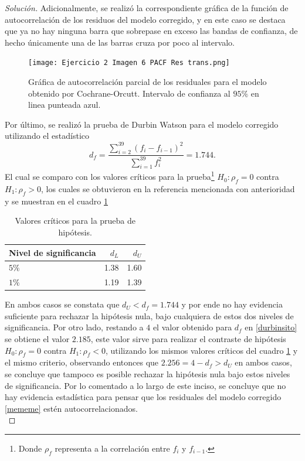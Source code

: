 \documentclass[10.5pt,notitlepage]{article}
\newenvironment{solucion}
  {\begin{proof}[Solución]}
  {\end{proof}}
\theoremstyle{plain}
\begin{document}
\begin{solucion}
Adicionalmente, se realizó la correspondiente gráfica de la función de autocorrelación de los residuos del modelo corregido, y en este caso se destaca que ya no hay ninguna barra que sobrepase en exceso las bandas de confianza, de hecho únicamente una de las barras cruza por poco al intervalo. 
\begin{figure}[htb]
 \centering
 \texttt{[image: Ejercicio 2 Imagen 6 PACF Res trans.png]}
 \caption{Gráfica de autocorrelación parcial de los residuales para el modelo obtenido por Cochrane-Orcutt. Intervalo de confianza al \(95\%\) en linea punteada azul.}
\label{fig:8}
\end{figure}
Por último, se realizó la prueba de Durbin Watson para el modelo corregido utilizando el estadístico 
\begin{equation}\label{durbinsito}
    d_f = \frac{\sum_{i = 2}^{39}(f_{i} - f_{i-1})^2}{\sum_{i = 1}^{39} f_{i}^2} =  1.744. 
\end{equation}
El cual se comparo con los valores críticos para la prueba\footnote{Donde \(\rho_f\) representa a la correlación entre \(f_i\) y \(f_{i-1}\).} \(H_0: \rho_f = 0\) contra \(H_1: \rho_f > 0\), los cuales se obtuvieron en la referencia mencionada con anterioridad y se muestran en el cuadro \ref{tab:Durbin2}
\begin{table}[H]
        \centering
        \begin{tabular}{@{}l@{\hskip 0.3in}r@{\hskip 0.3in}r@{}}
            \toprule
            Nivel de significancia& \(d_{L}\) & \(d_{U}\) \\
            \midrule
            \(5\%\) & 1.38   & 1.60   \\ 
            \(1\%\) & 1.19   & 1.39  \\ 
            \bottomrule
        \end{tabular}
        \caption{Valores críticos para la prueba de hipótesis.}
        \label{tab:Durbin2}
\end{table}
En ambos casos se constata que \(d_U < d_f = 1.744\) y por ende no hay evidencia suficiente para rechazar la hipótesis nula, bajo cualquiera de estos dos niveles de significancia. Por otro lado, restando a \(4\) el valor obtenido para \(d_f\) en \eqref{durbinsito} se obtiene el valor \(2.185\), este valor sirve para realizar el contraste de hipótesis \(H_0: \rho_f = 0\) contra \(H_1: \rho_f < 0\), utilizando los mismos valores críticos del cuadro \ref{tab:Durbin2} y el mismo criterio, observando entonces que \(2.256 = 4 - d_{f} > d_U\) en ambos casos, se concluye que tampoco es posible rechazar la hipótesis nula bajo estos niveles de significancia. Por lo comentado a lo largo de este inciso, se concluye que no hay evidencia estadística para pensar que los residuales del modelo corregido \eqref{mememe} estén autocorrelacionados.\\ 


\end{solucion}
\end{document}
